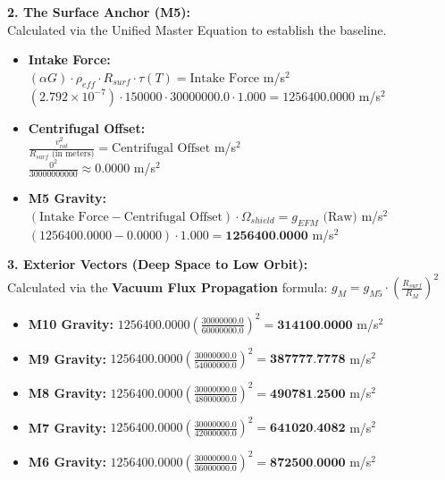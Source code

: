 \documentclass[11pt, a4paper]{article}
\begin{document}
  \vspace{1.0em}
  \noindent \textbf{2. The Surface Anchor (M5):} \\
  \hspace*{1em} Calculated via the Unified Master Equation to establish the baseline.
  \begin{itemize}
    \item \textbf{Intake Force:} \\[0.5em]
    \hspace*{2em} $(\alpha G) \cdot \rho_{eff} \cdot R_{surf} \cdot \tau(T) = \text{Intake Force}$ m/s$^2$ \\[1em]
    \hspace*{2em} $(2.792 \times 10^{-7}) \cdot 150000 \cdot 30000000.0 \cdot 1.000 = 1256400.0000$ m/s$^2$
    
    \item \textbf{Centrifugal Offset:} \\[0.5em]
    \hspace*{2em} $\frac{v_{rot}^2}{R_{surf} \text{ (in meters)}} = \text{Centrifugal Offset}$ m/s$^2$ \\[1em]
    \hspace*{2em} $\frac{0^2}{30000000000} \approx 0.0000$ m/s$^2$
    
    \item \textbf{M5 Gravity:} \\[0.5em]
    \hspace*{2em} $(\text{Intake Force} - \text{Centrifugal Offset}) \cdot \Omega_{shield} = g_{EFM} \text{ (Raw)}$ m/s$^2$ \\[1em]
    \hspace*{2em} $(1256400.0000 - 0.0000) \cdot 1.000 = \textbf{1256400.0000}$ m/s$^2$
  \end{itemize}

  \clearpage
  \noindent \textbf{3. Exterior Vectors (Deep Space to Low Orbit):} \\
  \hspace*{1em} Calculated via the \textbf{Vacuum Flux Propagation} formula: $g_M = g_{M5} \cdot \left( \frac{R_{surf}}{R_M} \right)^2$
  \begin{itemize}
    \item \textbf{M10 Gravity:} $1256400.0000 \left( \frac{30000000.0}{60000000.0} \right)^2 = \textbf{314100.0000}$ m/s$^2$
    \item \textbf{M9 Gravity:} $1256400.0000 \left( \frac{30000000.0}{54000000.0} \right)^2 = \textbf{387777.7778}$ m/s$^2$
    \item \textbf{M8 Gravity:} $1256400.0000 \left( \frac{30000000.0}{48000000.0} \right)^2 = \textbf{490781.2500}$ m/s$^2$
    \item \textbf{M7 Gravity:} $1256400.0000 \left( \frac{30000000.0}{42000000.0} \right)^2 = \textbf{641020.4082}$ m/s$^2$
    \item \textbf{M6 Gravity:} $1256400.0000 \left( \frac{30000000.0}{36000000.0} \right)^2 = \textbf{872500.0000}$ m/s$^2$
  \end{itemize}
\end{document}
